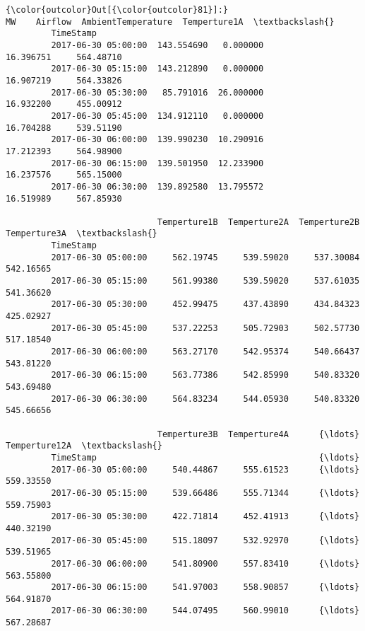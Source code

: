 \documentclass[11pt]{article}
\begin{document}
\begin{Verbatim}[commandchars=\\\{\}]
{\color{outcolor}Out[{\color{outcolor}81}]:}                              MW    Airflow  AmbientTemperature  Temperture1A  \textbackslash{}
         TimeStamp                                                                      
         2017-06-30 05:00:00  143.554690   0.000000           16.396751     564.48710   
         2017-06-30 05:15:00  143.212890   0.000000           16.907219     564.33826   
         2017-06-30 05:30:00   85.791016  26.000000           16.932200     455.00912   
         2017-06-30 05:45:00  134.912110   0.000000           16.704288     539.51190   
         2017-06-30 06:00:00  139.990230  10.290916           17.212393     564.98900   
         2017-06-30 06:15:00  139.501950  12.233900           16.237576     565.15000   
         2017-06-30 06:30:00  139.892580  13.795572           16.519989     567.85930   
         
                              Temperture1B  Temperture2A  Temperture2B  Temperture3A  \textbackslash{}
         TimeStamp                                                                     
         2017-06-30 05:00:00     562.19745     539.59020     537.30084     542.16565   
         2017-06-30 05:15:00     561.99380     539.59020     537.61035     541.36620   
         2017-06-30 05:30:00     452.99475     437.43890     434.84323     425.02927   
         2017-06-30 05:45:00     537.22253     505.72903     502.57730     517.18540   
         2017-06-30 06:00:00     563.27170     542.95374     540.66437     543.81220   
         2017-06-30 06:15:00     563.77386     542.85990     540.83320     543.69480   
         2017-06-30 06:30:00     564.83234     544.05930     540.83320     545.66656   
         
                              Temperture3B  Temperture4A      {\ldots}        Temperture12A  \textbackslash{}
         TimeStamp                                            {\ldots}                        
         2017-06-30 05:00:00     540.44867     555.61523      {\ldots}            559.33550   
         2017-06-30 05:15:00     539.66486     555.71344      {\ldots}            559.75903   
         2017-06-30 05:30:00     422.71814     452.41913      {\ldots}            440.32190   
         2017-06-30 05:45:00     515.18097     532.92970      {\ldots}            539.51965   
         2017-06-30 06:00:00     541.80900     557.83410      {\ldots}            563.55800   
         2017-06-30 06:15:00     541.97003     558.90857      {\ldots}            564.91870   
         2017-06-30 06:30:00     544.07495     560.99010      {\ldots}            567.28687   
         

\end{Verbatim}
\end{document}
